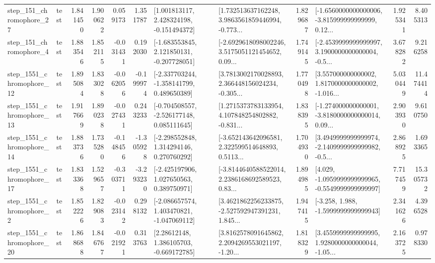 \begin{tabular}{llrrrrllrlrr}
  step\_151\_chromophore\_27 &      test &      1.841450 &    1.900622 &      0.059173 &  1.351787 &    [1.001813117, 2.428324198, -0.151494372] &  [1.732513637162248, 3.9863561859446994, -0.773... &       1.829687 &  [-1.6560000000000006, -3.815999999999999, 0.12... &            1.925341 &          8.405313 \\
   step\_151\_chromophore\_4 &      test &      1.883546 &    1.852115 &     -0.031431 &  0.192030 &   [-1.683553845, 2.121850131, -0.207728051] &  [-2.6929618098002246, 3.5175051121454652, 0.09... &       1.749145 &  [-2.4539999999999997, 3.1900000000000004, -0.5... &            3.678282 &          9.216258 \\
 step\_1551\_chromophore\_12 &      test &      1.895084 &    1.833028 &     -0.062056 & -0.199974 &   [-2.337703244, -1.358141799, 0.489650389] &  [3.7813002170028893, 2.366448156024234, -0.305... &       1.770498 &  [3.557000000000002, 1.8170000000000002, -1.016... &            5.030449 &         11.474414 \\
 step\_1551\_chromophore\_13 &      test &      1.917669 &    1.890238 &     -0.027431 &  0.243233 &   [-0.704508557, -2.526177148, 0.085111645] &  [1.2715373783133954, 4.107848254802882, -0.831... &       1.838395 &  [-1.274000000000001, -3.8180000000000014, 0.09... &            2.903930 &          9.610750 \\
 step\_1551\_chromophore\_14 &      test &      1.883736 &    1.735280 &     -0.148456 & -1.305928 &    [-2.298552848, 1.314294146, 0.270760292] &  [-3.652143642096581, 2.322599514648893, 0.5113... &       1.704930 &  [3.4949999999999974, -2.1409999999999982, -0.5... &            2.868925 &          1.693365 \\
 step\_1551\_chromophore\_17 &      test &      1.833368 &    1.529657 &     -0.303711 & -3.293230 &    [-2.425197906, 1.027650563, 0.389750971] &  [-3.8144640588522014, 2.2386168692589523, 0.83... &       1.894985 &  [4.029, -1.0959999999999965, -0.5549999999999997] &            7.717459 &         15.305732 \\
  step\_1551\_chromophore\_2 &      test &      1.852226 &    1.829083 &     -0.023142 &  0.298132 &   [-2.086657574, 1.403470821, -1.047069112] &  [3.4621862256233875, -2.527592947391231, 1.845... &       1.947415 &               [-3.258, 1.988, -1.5999999999999943] &            2.341626 &          4.396528 \\
 step\_1551\_chromophore\_20 &      test &      1.868688 &    1.846767 &     -0.021921 &  0.313763 &     [2.28612148, 1.386105703, -0.669172785] &  [3.8162578091645862, 2.2094269553021197, -1.20... &       1.818329 &  [3.4559999999999995, 1.9280000000000044, -1.05... &            2.163725 &          0.978330 \\

\end{tabular}
